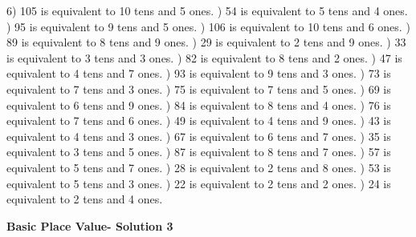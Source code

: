 \documentclass{article}%
\begin{document}
6) 105 is equivalent to  10 tens and 5 ones.%
) 54 is equivalent to  5 tens and 4 ones.%
) 95 is equivalent to  9 tens and 5 ones.%
) 106 is equivalent to  10 tens and 6 ones.%
) 89 is equivalent to  8 tens and 9 ones.%
) 29 is equivalent to  2 tens and 9 ones.%
) 33 is equivalent to  3 tens and 3 ones.%
) 82 is equivalent to  8 tens and 2 ones.%
) 47 is equivalent to  4 tens and 7 ones.%
) 93 is equivalent to  9 tens and 3 ones.%
) 73 is equivalent to  7 tens and 3 ones.%
) 75 is equivalent to  7 tens and 5 ones.%
) 69 is equivalent to  6 tens and 9 ones.%
) 84 is equivalent to  8 tens and 4 ones.%
) 76 is equivalent to  7 tens and 6 ones.%
) 49 is equivalent to  4 tens and 9 ones.%
) 43 is equivalent to  4 tens and 3 ones.%
) 67 is equivalent to  6 tens and 7 ones.%
) 35 is equivalent to  3 tens and 5 ones.%
) 87 is equivalent to  8 tens and 7 ones.%
) 57 is equivalent to  5 tens and 7 ones.%
) 28 is equivalent to  2 tens and 8 ones.%
) 53 is equivalent to  5 tens and 3 ones.%
) 22 is equivalent to  2 tens and 2 ones.%
) 24 is equivalent to  2 tens and 4 ones.%
\newline%
\newpage%
\large%
\begin{center}%
\textbf{Basic Place Value- Solution 3}%
\newline%
\end{center} \normalsize%
\end{document}
